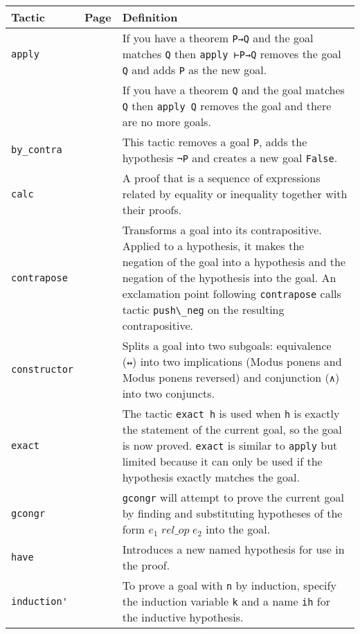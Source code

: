 \begin{tabular}{p{}|r|p{}}
\hline
Tactic & Page & Definition\\
\hline
\Verb+apply+&\pageref{p.apply}&If you have a theorem \Verb+P→Q+ and the goal matches \Verb+Q+ then \Verb+apply ⊢P→Q+ removes the goal \Verb+Q+ and adds \Verb+P+ as the new goal.\\
&&If you have a theorem \Verb+Q+ and the goal matches \Verb+Q+ then \Verb+apply Q+ removes the goal and there are no more goals.\\\hline

\Verb+by_contra+&\pageref{p.by-contra}&This tactic removes a goal \Verb+P+, adds the hypothesis \Verb+¬P+ and creates a new goal \Verb+False+.\\\hline

\Verb+calc+&\pageref{p.calc}&A proof that is a sequence of expressions related by equality or inequality together with their proofs.\\\hline

\Verb+contrapose+&\pageref{p.contrapose}&Transforms a goal into its contrapositive. Applied to a hypothesis, it makes the negation of the goal into a hypothesis and the negation of the hypothesis into the goal. 
An exclamation point following \Verb+contrapose+ calls tactic \Verb+push\_neg+ on the resulting contrapositive.\\\hline

\Verb+constructor+&\pageref{p.constructor}&Splits a goal into two subgoals: equivalence (\Verb+↔+) into two implications (Modus ponens and Modus ponens reversed) and conjunction (\Verb+∧+) into two conjuncts.\\\hline

\Verb+exact+&\pageref{p.exact}&The tactic \Verb+exact h+ is used when \Verb+h+ is exactly the statement of the current goal, so the goal is now proved. \Verb+exact+ is similar to \Verb+apply+ but limited because it can only be used if the hypothesis exactly matches the goal.\\\hline

\Verb+gcongr+&\pageref{p.gcongr}&\Verb+gcongr+ will attempt to prove the current goal by finding and substituting hypotheses of the form $\mathit{e_1 \; rel\_op \; e_2}$ into the goal.\\\hline

\Verb+have+&\pageref{p.have}&Introduces a new named hypothesis for use in the proof.\\\hline

\Verb+induction'+&\pageref{p.induction}&To prove a goal with \Verb+n+ by induction, specify the induction variable \Verb+k+ and a name \Verb+ih+ for the inductive hypothesis.\\\hline


\end{tabular}
